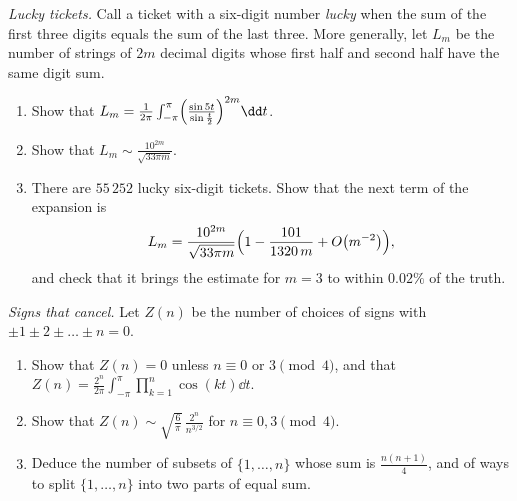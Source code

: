 \begin{exercise}[$\star\star$]\label{pb:lucky}
\emph{Lucky tickets.} Call a ticket with a six-digit number \emph{lucky} when the sum of the first three digits
equals the sum of the last three. More generally, let $L_m$ be the number of strings of $2m$ decimal digits whose first half and second half have the same digit sum.
\begin{enumerate}[label=(\alph*)]
\item Show that $L_m=\frac1{2\pi}\int_{-\pi}^\pi\Bigl(\frac{\sin5t}{\sin\frac t2}\Bigr)^{2m}\dd t$.
\item Show that $L_m\sim\frac{10^{2m}}{\sqrt{33\pi m}}$.
\item There are $55\,252$ lucky six-digit tickets. Show that the next term of the expansion is
\[
L_m=\frac{10^{2m}}{\sqrt{33\pi m}}\Bigl(1-\frac{101}{1320\,m}+O\bigl(m^{-2}\bigr)\Bigr),
\]
and check that it brings the estimate for $m=3$ to within $0.02\%$ of the truth.
\end{enumerate}
\end{exercise}

\begin{exercise}[$\star\star\star$]\label{pb:signedsums}
\emph{Signs that cancel.} Let $Z(n)$ be the number of choices of signs with $\pm1\pm2\pm\dots\pm n=0$.
\begin{enumerate}[label=(\alph*)]
\item Show that $Z(n)=0$ unless $n\equiv0$ or $3\pmod4$, and that $Z(n)=\frac{2^n}{2\pi}\int_{-\pi}^\pi\prod_{k=1}^n\cos(kt)\dd t$.
\item Show that $Z(n)\sim\sqrt{\frac6\pi}\,\frac{2^n}{n^{3/2}}$ for $n\equiv0,3\pmod4$.
\item Deduce the number of subsets of $\{1,\dots,n\}$ whose sum is $\frac{n(n+1)}4$, and of ways to split $\{1,\dots,n\}$ into two parts of equal sum.
\end{enumerate}
\end{exercise}

